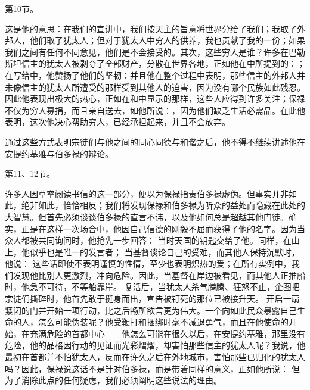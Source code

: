 第10节。\par

这是他的意思：在我们的宣讲中，我们按天主的旨意将世界分给了我们；我取了外邦人，他们取了犹太人；但对于犹太人中穷人的供养，我也贡献了我的一份；如果我们之间有任何不同意见，他们是不会接受的。其次，这些穷人是谁？许多在巴勒斯坦信主的犹太人被剥夺了全部财产，分散在世界各地，正如他在中所提到的：；在写给中，他赞扬了他们的坚韧：并且他在整个过程中表明，那些信主的外邦人并未像信主的犹太人所遭受的那样受到其他人的迫害，因为没有哪个民族如此残忍。因此他表现出极大的热心，正如在和中显示的那样，这些人应得到许多关注；保禄不仅为穷人募捐，而且亲自送去，如他所说：，因为他们缺乏生活必需品。在此他表明，这次他决心帮助穷人，已经承担起来，并且不会放弃。\par

通过这些方式表明宗徒们与他之间的同心同德与和谐之后，他不得不继续讲述他在安提约基雅与伯多禄的辩论。\par

第11、12节。\par

许多人因草率阅读书信的这一部分，便以为保禄指责伯多禄虚伪。但事实并非如此，绝非如此，恰恰相反；我们将发现保禄和伯多禄为听众的益处而隐藏在此处的大智慧。但首先必须谈谈伯多禄的直言不讳，以及他如何总是超越其他门徒。确实，正是在这样一次场合中，他因自己信德的刚毅不屈而获得了他的名字。因为当众人都被共同询问时，他抢先一步回答： 当时天国的钥匙交给了他。同样，在山上，他似乎也是唯一的发言者； 当基督谈论自己的受难，而其他人保持沉默时，他说： 这些话即使不表明谨慎的性情，至少也表明炽热的爱；在所有实例中，我们发现他比别人更激烈，冲向危险。因此，当基督在岸边被看见，而其他人正推船时，他急不可待，不等船靠岸。 复活后，当犹太人杀气腾腾、狂怒不止，企图把宗徒们撕碎时，他首先敢于挺身而出，宣告被钉死的那位已被接升天。 开启一扇紧闭的门并开始一项行动，比之后畅所欲言更为伟大。一个向如此民众暴露自己生命的人，怎么可能伪装呢？他受鞭打和捆绑时毫不减退勇气，而且在他使命的开始，在充满危险的首都中心——他怎么可能在很久以后，在安提约基雅，那里没有危险，他的品格因行动的见证而光彩熠熠，却害怕那些信主的犹太人呢？我说，他最初在首都并不怕犹太人，反而在许久之后在外地城市，害怕那些已归化的犹太人吗？因此，保禄说这话不是针对伯多禄，而是带着同样的意义，正如他所说： 但为了消除此点的任何疑虑，我们必须阐明这些说法的理由。\par

